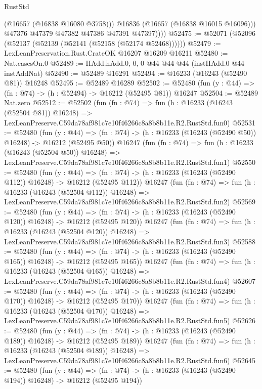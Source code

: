 \begin{lexlean}{RustStd}
\begin{coremodule}
                (@16657 (@16838 @16080 @3758)))
              @16836
              (@16657 (@16838 @16015 @16096)))
            @47376
            @47379
            @47382
            @47386
            @47391
            @47397))))
@52475 := @52071 (@52096 (@52137 (@52139 (@52141 (@52158 (@52174 @52468))))))
@52479 := LexLeanPreservation.Rust.CrateOK @16207 @16209 @16211
@52480 := Nat.casesOn.{0}
@52489 := HAdd.hAdd.{0, 0, 0} @44 @44 @44 (instHAdd.{0} @44 instAddNat)
@52490 := @52489 @16291
@52494 := @16233 (@16243 (@52490 @81)) @16248
@52495 := @52489 @16289
@52502 := @52480 (fun (y : @44) => (fn : @74) -> (h : @52494) -> @16212 (@52495 @81)) @16247
@52504 := @52489 Nat.zero
@52512 := @52502
    (fun (fn : @74) =>
    fun (h : @16233 (@16243 (@52504 @81)) @16248) =>
    LexLeanPreserve.C59da78af981c7e10f46266c8a8b8b11e.R2.RustStd.fun0)
@52531 := @52480
    (fun (y : @44) =>
    (fn : @74) -> (h : @16233 (@16243 (@52490 @50)) @16248) -> @16212 (@52495 @50))
    @16247
    (fun (fn : @74) =>
    fun (h : @16233 (@16243 (@52504 @50)) @16248) =>
    LexLeanPreserve.C59da78af981c7e10f46266c8a8b8b11e.R2.RustStd.fun1)
@52550 := @52480
    (fun (y : @44) =>
    (fn : @74) -> (h : @16233 (@16243 (@52490 @112)) @16248) -> @16212 (@52495 @112))
    @16247
    (fun (fn : @74) =>
    fun (h : @16233 (@16243 (@52504 @112)) @16248) =>
    LexLeanPreserve.C59da78af981c7e10f46266c8a8b8b11e.R2.RustStd.fun2)
@52569 := @52480
    (fun (y : @44) =>
    (fn : @74) -> (h : @16233 (@16243 (@52490 @120)) @16248) -> @16212 (@52495 @120))
    @16247
    (fun (fn : @74) =>
    fun (h : @16233 (@16243 (@52504 @120)) @16248) =>
    LexLeanPreserve.C59da78af981c7e10f46266c8a8b8b11e.R2.RustStd.fun3)
@52588 := @52480
    (fun (y : @44) =>
    (fn : @74) -> (h : @16233 (@16243 (@52490 @165)) @16248) -> @16212 (@52495 @165))
    @16247
    (fun (fn : @74) =>
    fun (h : @16233 (@16243 (@52504 @165)) @16248) =>
    LexLeanPreserve.C59da78af981c7e10f46266c8a8b8b11e.R2.RustStd.fun4)
@52607 := @52480
    (fun (y : @44) =>
    (fn : @74) -> (h : @16233 (@16243 (@52490 @170)) @16248) -> @16212 (@52495 @170))
    @16247
    (fun (fn : @74) =>
    fun (h : @16233 (@16243 (@52504 @170)) @16248) =>
    LexLeanPreserve.C59da78af981c7e10f46266c8a8b8b11e.R2.RustStd.fun5)
@52626 := @52480
    (fun (y : @44) =>
    (fn : @74) -> (h : @16233 (@16243 (@52490 @189)) @16248) -> @16212 (@52495 @189))
    @16247
    (fun (fn : @74) =>
    fun (h : @16233 (@16243 (@52504 @189)) @16248) =>
    LexLeanPreserve.C59da78af981c7e10f46266c8a8b8b11e.R2.RustStd.fun6)
@52645 := @52480
    (fun (y : @44) =>
    (fn : @74) -> (h : @16233 (@16243 (@52490 @194)) @16248) -> @16212 (@52495 @194))

\end{coremodule}
\end{lexlean}
